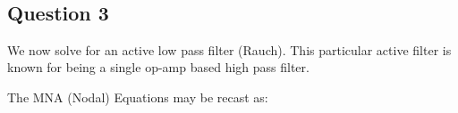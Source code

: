 \documentclass[10pt,notitlepage,onecolumn,aps,pra]{revtex4-1}
\begin{document}
    \begin{center}
    \end{center}
    { \hspace*{\fill} \\}
    
    \begin{center}
    \end{center}
    { \hspace*{\fill} \\}
    
    \begin{center}
    \end{center}
    { \hspace*{\fill} \\}
    
    \begin{center}
    \end{center}
    { \hspace*{\fill} \\}
    
    \hypertarget{question-3}{%
\subsection{Question 3}\label{question-3}}

We now solve for an active low pass filter (Rauch). This particular
active filter is known for being a single op-amp based high pass filter.

The MNA (Nodal) Equations may be recast as:
\end{document}
